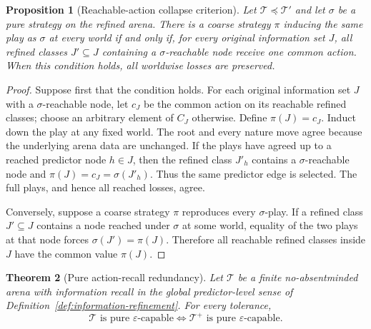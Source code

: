 \documentclass[11pt]{article}
\theoremstyle{plain}
\newtheorem{theorem}{Theorem}[section]
\newtheorem{proposition}[theorem]{Proposition}
\theoremstyle{definition}
\theoremstyle{remark}
\newcommand{\eps}{\varepsilon}
\begin{document}
\begin{proposition}[Reachable-action collapse criterion]
\label{prop:refinement-collapse}
Let $\mathcal T\preceq\mathcal T'$ and let $\sigma$ be a pure strategy on the
refined arena. There is a coarse strategy $\pi$ inducing the same play as
$\sigma$ at every world if and only if, for every original information set
$J$, all refined classes $J'\subseteq J$ containing a $\sigma$-reachable node
receive one common action. When this condition holds, all worldwise losses are
preserved.
\end{proposition}

\begin{proof}
Suppose first that the condition holds. For each original information set $J$
with a $\sigma$-reachable node, let $c_J$ be the common action on its reachable
refined classes; choose an arbitrary element of $C_J$ otherwise. Define
$\pi(J)=c_J$. Induct down the play at any fixed world. The root and every nature
move agree because the underlying arena data are unchanged. If the plays have
agreed up to a reached predictor node $h\in J$, then the refined class $J'_h$
contains a $\sigma$-reachable node and
$\pi(J)=c_J=\sigma(J'_h)$. Thus the same predictor edge is selected. The full
plays, and hence all reached losses, agree.

Conversely, suppose a coarse strategy $\pi$ reproduces every $\sigma$-play.
If a refined class $J'\subseteq J$ contains a node reached under $\sigma$ at
some world, equality of the two plays at that node forces
$\sigma(J')=\pi(J)$. Therefore all reachable refined classes inside $J$ have
the common value $\pi(J)$.
\end{proof}

\begin{theorem}[Pure action-recall redundancy]
\label{thm:action-recall-equivalence}
Let $\mathcal T$ be a finite no-absentminded arena with information recall in
the global predictor-level sense of Definition~\ref{def:information-refinement}.
For every tolerance,
\[
\mathcal T\text{ is pure $\eps$-capable}
\iff
\mathcal T^+\text{ is pure $\eps$-capable}.
\]
\end{theorem}
\end{document}
